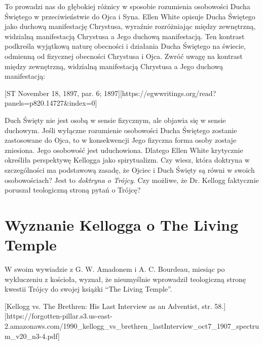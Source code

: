 To prowadzi nas do głębokiej różnicy w sposobie rozumienia osobowości Ducha Świętego w przeciwieństwie do Ojca i Syna. Ellen White opisuje Ducha Świętego jako duchową manifestację Chrystusa, wyraźnie rozróżniając między zewnętrzną, widzialną manifestacją Chrystusa a Jego duchową manifestacją. Ten kontrast podkreśla wyjątkową naturę obecności i działania Ducha Świętego na świecie, odmienną od fizycznej obecności Chrystusa i Ojca. Zwróć uwagę na kontrast między zewnętrzną, widzialną manifestacją Chrystusa a Jego duchową manifestacją:

[ST November 18, 1897, par. 6; 1897][https://egwwritings.org/read?panels=p820.14727&index=0]

Duch Święty nie jest osobą w sensie fizycznym, ale objawia się w sensie duchowym. Jeśli wyłączne rozumienie osobowości Ducha Świętego zostanie zastosowane do Ojca, to w konsekwencji Jego fizyczna forma osoby zostaje zniesiona. Jego osobowość jest uduchowiona. Dlatego Ellen White krytycznie określiła perspektywę Kellogga jako spirytualizm. Czy wiesz, która doktryna w szczególności ma podstawową zasadę, że Ojciec i Duch Święty są równi w swoich osobowościach? Jest to \textit{doktryna o Trójcy}. Czy możliwe, że Dr. Kellogg faktycznie poruszał teologiczną stroną pytań o Trójcę?

\section*{Wyznanie Kellogga o The Living Temple}

W swoim wywiadzie z G. W. Amadonem i A. C. Bourdeau, miesiąc po wykluczeniu z kościoła, wyznał, że nieumyślnie wprowadził teologiczną stronę kwestii Trójcy do swojej książki “The Living Temple”.

[Kellogg vs. The Brethren: His Last Interview as an Adventist, str. 58.][https://forgotten-pillar.s3.us-east-2.amazonaws.com/1990\_kellogg\_vs\_brethren\_lastInterview\_oct7\_1907\_spectrum\_v20\_n3-4.pdf]


